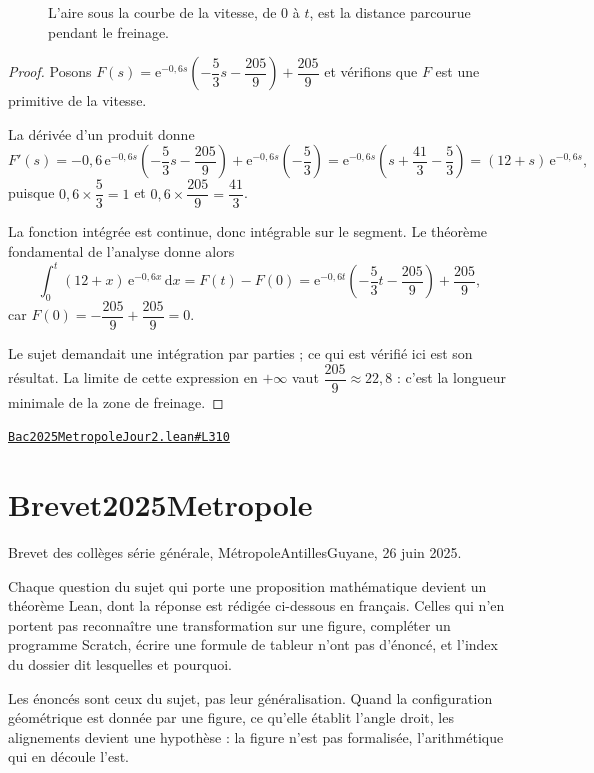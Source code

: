 \documentclass[11pt,a4paper]{article}
\theoremstyle{definition}
\theoremstyle{plain}
\theoremstyle{definition}
\newcommand{\source}[2]{\par\smallskip\noindent\hfill{\footnotesize\href{#1}{\texttt{#2}}}\par\smallskip}
\begin{document}
\begin{figure}[h]
\centering

\caption{L'aire sous la courbe de la vitesse, de \(0\) à \(t\), est la distance parcourue pendant le freinage.}
\end{figure}
\begin{proof}
Posons $F(s) = \mathrm{e}^{-0{,}6s}\left(-\dfrac{5}{3}s - \dfrac{205}{9}\right) +
\dfrac{205}{9}$ et vérifions que $F$ est une primitive de la vitesse.

La dérivée d'un produit donne
\[ F'(s) = -0{,}6\,\mathrm{e}^{-0{,}6s}\left(-\frac{5}{3}s - \frac{205}{9}\right)
        + \mathrm{e}^{-0{,}6s}\left(-\frac{5}{3}\right)
   = \mathrm{e}^{-0{,}6s}\left(s + \frac{41}{3} - \frac{5}{3}\right)
   = (12 + s)\,\mathrm{e}^{-0{,}6s} , \]
puisque $0{,}6 \times \dfrac{5}{3} = 1$ et $0{,}6 \times \dfrac{205}{9} = \dfrac{41}{3}$.

La fonction intégrée est continue, donc intégrable sur le segment. Le théorème fondamental
de l'analyse donne alors
\[ \int_0^t (12 + x)\,\mathrm{e}^{-0{,}6x}\,\mathrm{d}x = F(t) - F(0)
   = \mathrm{e}^{-0{,}6t}\left(-\frac{5}{3}t - \frac{205}{9}\right) + \frac{205}{9} , \]
car $F(0) = -\dfrac{205}{9} + \dfrac{205}{9} = 0$.

Le sujet demandait une intégration par parties ; ce qui est vérifié ici est son résultat.
La limite de cette expression en $+\infty$ vaut $\dfrac{205}{9} \approx 22{,}8$ : c'est la
longueur minimale de la zone de freinage.
\end{proof}
\source{https://github.com/Commutator-IO/learn-lean/blob/main/exams/2025/Bac2025MetropoleJour2.lean\#L310}{Bac2025MetropoleJour2.lean\#L310}

\section{Brevet2025Metropole}

\noindent
Brevet des collèges \textemdash{} série générale, Métropole\textendash{}Antilles\textendash{}Guyane, 26 juin 2025.

Chaque question du sujet qui porte une proposition mathématique devient un théorème
Lean, dont la réponse est rédigée ci-dessous en français. Celles qui n'en portent pas \textemdash{} reconnaître une transformation sur une
figure, compléter un programme Scratch, écrire une formule de tableur \textemdash{} n'ont pas
d'énoncé, et l'index du dossier dit lesquelles et pourquoi.

Les énoncés sont ceux du sujet, pas leur généralisation. Quand la configuration
géométrique est donnée par une figure, ce qu'elle établit \textemdash{} l'angle droit, les
alignements \textemdash{} devient une hypothèse : la figure n'est pas formalisée, l'arithmétique
qui en découle l'est.
\end{document}
